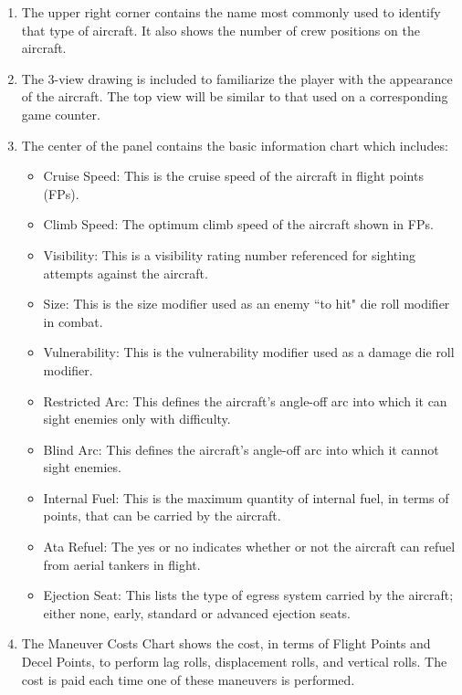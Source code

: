 \begin{enumerate}

    \item {} 
    The upper right corner contains the name most commonly used to identify that type of aircraft. It also shows the number of crew positions on the aircraft.


    \item {} 
    The 3-view drawing is included to familiarize the player with the appearance of the aircraft. The top view will be similar to that used on a corresponding game counter.

    \item {} 
    The center of the panel contains the basic information chart which includes:
    \begin{itemize}
        \item Cruise Speed: This is the cruise speed of the aircraft in flight points (FPs).
        \item Climb Speed: The optimum climb speed of the aircraft shown in FPs.
        \item Visibility: This is a visibility rating number referenced for sighting attempts against the aircraft.
        \item Size: This is the size modifier used as an enemy “to hit" die roll modifier in combat.
        \item Vulnerability: This is the vulnerability modifier used as a damage die roll modifier.
        \item Restricted Arc: This defines the aircraft's angle-off arc into which it can sight enemies only with difficulty.
        \item Blind Arc: This defines the aircraft's angle-off arc into which it cannot sight enemies.
        \item Internal Fuel: This is the maximum quantity of internal fuel, in terms of points, that can be carried by the aircraft.
        \item Ata Refuel: The yes or no indicates whether or not the aircraft can refuel from aerial tankers in flight.
        \item Ejection Seat: This lists the type of egress system carried by the aircraft; either none, early, standard or advanced ejection seats.
    \end{itemize}

    \item {} 
    The Maneuver Costs Chart shows the cost, in terms of Flight Points and Decel Points, to perform lag rolls, displacement rolls, and vertical rolls. The cost is paid each time one of these maneuvers is performed.


\end{enumerate}
